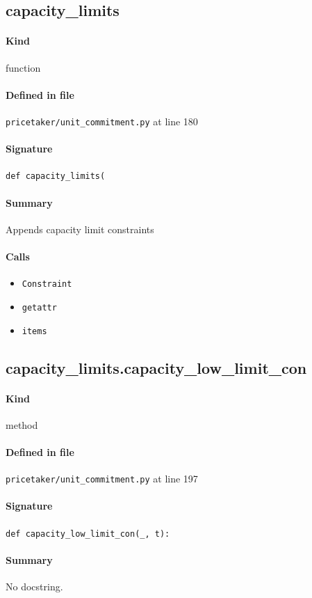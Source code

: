 \documentclass[11pt]{report}
\begin{document}
\subsection{capacity\_limits}
\label{def:pricetaker-unit_commitment.py:capacity_limits:L180}
\paragraph{Kind} function
\paragraph{Defined in file} \texttt{pricetaker/unit\_commitment.py} at line 180
\paragraph{Signature} \texttt{def capacity\_limits(}
\paragraph{Summary} Appends capacity limit constraints
\paragraph{Calls}
\begin{itemize}[leftmargin=*]
  \item \texttt{Constraint}
  \item \texttt{getattr}
  \item \texttt{items}
\end{itemize}
\subsection{capacity\_limits.capacity\_low\_limit\_con}
\label{def:pricetaker-unit_commitment.py:capacity_limits.capacity_low_limit_con:L197}
\paragraph{Kind} method
\paragraph{Defined in file} \texttt{pricetaker/unit\_commitment.py} at line 197
\paragraph{Signature} \texttt{def capacity\_low\_limit\_con(\_, t):}
\paragraph{Summary} No docstring.
\end{document}
